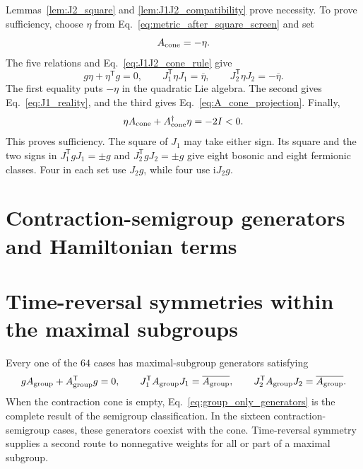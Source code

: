 \documentclass[onecolumn,aps,prb,amsmath,amssymb,superscriptaddress,longbibliography,floatfix]{revtex4-2}
\newcommand{\ii}{\mathrm{i}}
\newcommand{\trans}{\mathsf{T}}
\begin{document}
Lemmas~\ref{lem:J2_square} and \ref{lem:J1J2_compatibility} prove necessity.  To prove sufficiency, choose \(\eta\) from Eq.~\eqref{eq:metric_after_square_screen} and set
\begin{equation}
    A_{\rm cone}=-\eta .
    \label{eq:universal_cone_witness}
\end{equation}
The five relations and Eq.~\eqref{eq:J1J2_cone_rule} give
\begin{equation}
g\eta+\eta^\trans g=0,\qquad
J_1^\trans\eta J_1=\overline\eta,\qquad
J_2^\trans\eta J_2=-\overline\eta.
\label{eq:metric_witness_checks}
\end{equation}
The first equality puts \(-\eta\) in the quadratic Lie algebra.  The second gives Eq.~\eqref{eq:J1_reality}, and the third gives Eq.~\eqref{eq:A_cone_projection}.  Finally,
\begin{equation}
    \eta A_{\rm cone}+A_{\rm cone}^\dagger\eta=-2I<0.
    \label{eq:universal_strict_contraction}
\end{equation}
This proves sufficiency.  The square of \(J_1\) may take either sign.  Its square and the two signs in \(J_1^\trans gJ_1=\pm g\) and \(J_2^\trans gJ_2=\pm g\) give eight bosonic and eight fermionic classes.  Four in each set use \(J_2g\), while four use \(\ii J_2g\).

\section{Contraction-semigroup generators and Hamiltonian terms}




\section{Time-reversal symmetries within the maximal subgroups}
\label{sec:group_only_TR}

Every one of the \(64\) cases has maximal-subgroup generators satisfying
\begin{equation}
\begin{gathered}
    gA_{\rm group}+A_{\rm group}^\trans g=0,\qquad
    J_1^\trans A_{\rm group}J_1=\overline{A_{\rm group}},\qquad
    J_2^\trans A_{\rm group}J_2=\overline{A_{\rm group}}.
\end{gathered}
    \label{eq:group_only_generators}
\end{equation}
When the contraction cone is empty, Eq.~\eqref{eq:group_only_generators} is the complete result of the semigroup classification.  In the sixteen contraction-semigroup cases, these generators coexist with the cone.  Time-reversal symmetry supplies a second route to nonnegative weights for all or part of a maximal subgroup.
\end{document}
